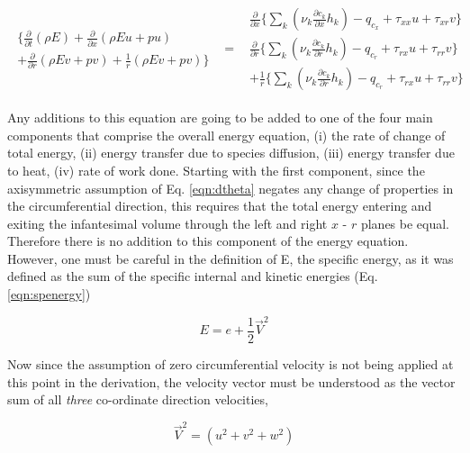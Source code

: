 \begin{equation}
	\begin{array}{ccc}
		\begin{array}{c}
		\Big\{\frac{\partial}{\partial t}(\rho E) +\frac{\partial}{\partial x}(\rho E u + pu) \\
		+ \frac{\partial}{\partial r}(\rho E v + pv) + \frac{1}{r}(\rho E v + pv)\Big\}
		\end{array} & = &
		\begin{array}{c}
			\frac{\partial}{\partial x}\Big\{
			\sum_k (\nu_k \frac{\partial c_k}{\partial x}h_k) 
			- q_{c_x} +  \tau_{xx}u + \tau_{xr}v \Big\} \\
			\frac{\partial}{\partial r}\Big\{
			\sum_k (\nu_k \frac{\partial c_k}{\partial r}h_k)
			-  q_{c_r} + \tau_{rx}u + \tau_{rr}v  \Big\} \\
			+\frac{1}{r}\Big\{\sum_k (\nu_k \frac{\partial c_k}{\partial r}h_k) - q_{c_r} + \tau_{rx}u 
			+ \tau_{rr}v\Big\}
		\end{array}  
	\end{array}
\label{eqn:energy2}
\end{equation}

	Any additions to this equation are going to be added to one of the four main components that comprise the
overall energy equation, (i) the rate of change of total energy, (ii) energy transfer due to species diffusion,
(iii) energy transfer due to heat, (iv) rate of work done.  Starting with the first component, since the 
axisymmetric assumption of Eq. \ref{eqn:dtheta} negates any change of properties in the circumferential 
direction, this requires that the total energy entering and exiting the infantesimal volume through the 
left and right $x$ - $r$ planes be equal.  Therefore there is no addition to this component of the energy
equation.  However, one must be careful in the definition of E, the specific energy, as it was defined as the 
sum of the specific internal and kinetic energies (Eq. \ref{eqn:spenergy})

\begin{displaymath}
	E = e + \frac{1}{2}\vec{V}^2 
\end{displaymath}

	Now since the assumption of zero circumferential velocity is not being applied at this point in the derivation, 
the velocity vector must be understood as the vector sum of all \emph{three} co-ordinate direction velocities,

\begin{equation}
	\vec{V}^2 = (u^2 + v^2 + w^2)
\label{eqn:totvel}
\end{equation}

